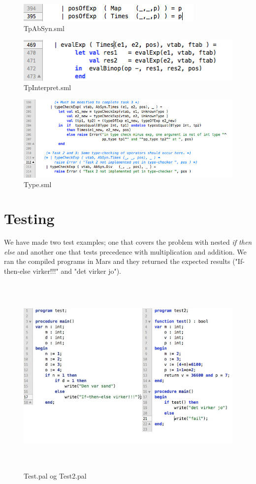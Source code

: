 \documentclass[12pt,a4paper,english]{article}
\begin{document}
\begin{figure}\includegraphics[]{TpAbSyn4.jpg}\caption{TpAbSyn.sml}\end{figure}
\begin{figure}\includegraphics[]{TpInterpret.jpg}\caption{TpInterpret.sml}\end{figure}
\begin{figure}\includegraphics[width=15cm]{Type.jpg}\caption{Type.sml}\end{figure}

\newpage
\section{Testing}
We have made two test examples; one that covers the problem with nested \textit{if then else} and another one that tests precedence with multiplication and addition. We ran the compiled programs in Mars and they returned the expected results ("If-then-else virker!!!" and "det virker jo").
\begin{figure}[h]\includegraphics[height=10cm]{Testing.jpg}\caption{Test.pal og Test2.pal}\end{figure}
\end{document}
